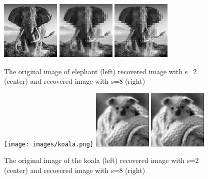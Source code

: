 \documentclass{article}
\begin{document}
\begin{figure}[H]
    \captionsetup{width=.5\linewidth}
    \centering
        \includegraphics[width=0.25\textwidth]{images/elephant.png}
        \includegraphics[width=0.25\textwidth]{images/elephant-recovered_02.png}
        \includegraphics[width=0.25\textwidth]{images/elephant-recovered_08.png}
        \caption{The original image of elephant (left) recovered image with s=2 (center) and recovered image with s=8 (right)}
\end{figure}

\begin{figure}[H]
    \captionsetup{width=.5\linewidth}
    \centering
        \texttt{[image: images/koala.png]}
        \includegraphics[width=0.25\textwidth]{images/koala-recovered_02.png}
        \includegraphics[width=0.25\textwidth]{images/koala-recovered_08.png}
        \caption{The original image of the koala (left) recovered image with s=2 (center) and recovered image with s=8 (right)}
\end{figure}
\end{document}
